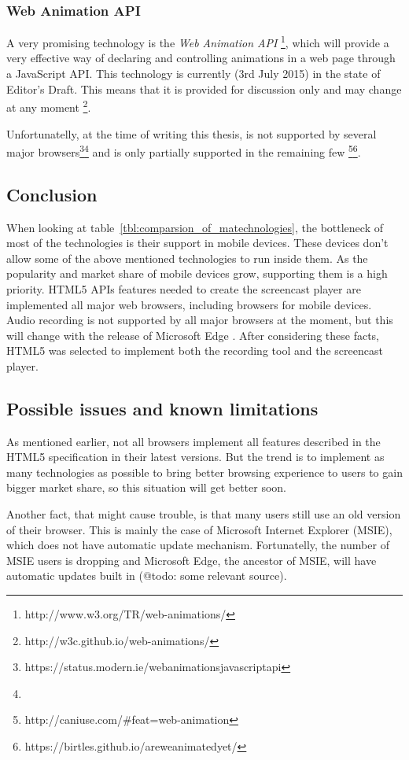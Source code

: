 \subsubsection*{Web Animation API}
A very promising technology is the \textit{Web Animation API} \footnote{http://www.w3.org/TR/web-animations/}, which will provide a very effective way of declaring and controlling animations in a web page through a JavaScript API. This technology is currently (3rd July 2015) in the state of Editor's Draft. This means that it is provided for discussion only and may change at any moment \cite{} \footnote{http://w3c.github.io/web-animations/}.

Unfortunatelly, at the time of writing this thesis, is not supported by several major browsers\footnote{https://status.modern.ie/webanimationsjavascriptapi}\footnote{} and is only partially supported in the remaining few \footnote{http://caniuse.com/\#feat=web-animation}\footnote{https://birtles.github.io/areweanimatedyet/}.

\subsection{Conclusion}
When looking at table~\ref{tbl:comparsion_of_matechnologies}, the bottleneck of most of the technologies is their support in mobile devices. These devices don't allow some of the above mentioned technologies to run inside them. As the popularity and market share of mobile devices grow, supporting them is a high priority. HTML5 APIs features needed to create the screencast player are implemented all major web browsers, including browsers for mobile devices. Audio recording is not supported by all major browsers at the moment, but this will change with the release of Microsoft Edge \cite{edge_getusermedia}. After considering these facts, HTML5 was selected to implement both the recording tool and the screencast player.

\subsection{Possible issues and known limitations}
As mentioned earlier, not all browsers implement all features described in the HTML5 specification in their latest versions. But the trend is to implement as many technologies as possible to bring better browsing experience to users to gain bigger market share, so this situation will get better soon.

Another fact, that might cause trouble, is that many users still use an old version of their browser. This is mainly the case of Microsoft Internet Explorer (MSIE), which does not have automatic update mechanism. Fortunatelly, the number of MSIE users is dropping and Microsoft Edge, the ancestor of MSIE, will have automatic updates built in (@todo: some relevant source).

